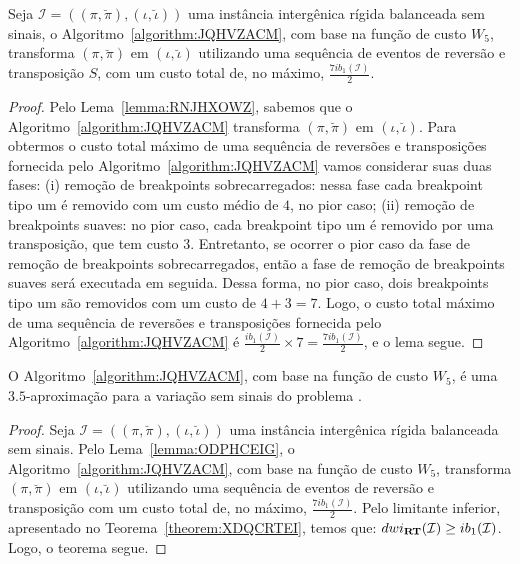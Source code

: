 \begin{lemma}\label{lemma:ODPHCEIG}
Seja $\mathcal{I} = ((\pi,\breve\pi),(\iota,\breve\iota))$ uma instância intergênica rígida balanceada sem sinais, o Algoritmo~\ref{algorithm:JQHVZACM}, com base na função de custo $W_5$, transforma $(\pi,\breve\pi)$ em $(\iota,\breve\iota)$ utilizando uma sequência de eventos de reversão e transposição $S$, com um custo total de, no máximo, $\frac{7ib_1(\mathcal{I})}{2}$.
\end{lemma}
\begin{proof}
Pelo Lema~\ref{lemma:RNJHXOWZ}, sabemos que o Algoritmo~\ref{algorithm:JQHVZACM} transforma $(\pi,\breve\pi)$ em $(\iota,\breve\iota)$. Para obtermos o custo total máximo de uma sequência de reversões e transposições fornecida pelo Algoritmo~\ref{algorithm:JQHVZACM} vamos considerar suas duas fases: (i) remoção de breakpoints sobrecarregados: nessa fase cada breakpoint tipo um é removido com um custo médio de $4$, no pior caso; (ii) remoção de breakpoints suaves: no pior caso, cada breakpoint tipo um é removido por uma transposição, que tem custo $3$. Entretanto, se ocorrer o pior caso da fase de remoção de breakpoints sobrecarregados, então a fase de remoção de breakpoints suaves será executada em seguida. Dessa forma, no pior caso, dois breakpoints tipo um são removidos com um custo de $4 + 3 = 7$. Logo, o custo total máximo de uma sequência de reversões e transposições fornecida pelo Algoritmo~\ref{algorithm:JQHVZACM} é $\frac{ib_1(\mathcal{I})}{2} \times 7 = \frac{7ib_1(\mathcal{I})}{2}$, e o lema segue. 
\end{proof}

\begin{theorem}\label{theorem:SEJEYSUH}
O Algoritmo~\ref{algorithm:JQHVZACM}, com base na função de custo $W_5$, é uma $3.5$-aproxima\-ção para a variação sem sinais do problema \SbWIRT{}.
\end{theorem}
\begin{proof}
Seja $\mathcal{I} = ((\pi,\breve\pi),(\iota,\breve\iota))$ uma instância intergênica rígida balanceada sem sinais. Pelo Lema~\ref{lemma:ODPHCEIG}, o Algoritmo~\ref{algorithm:JQHVZACM}, com base na função de custo $W_5$, transforma $(\pi,\breve\pi)$ em $(\iota,\breve\iota)$ utilizando uma sequência de eventos de reversão e transposição com um custo total de, no máximo, $\frac{7ib_1(\mathcal{I})}{2}$. Pelo limitante inferior, apresentado no Teorema~\ref{theorem:XDQCRTEI}, temos que: $dwi_{\textbf{RT}}(\mathcal{I}) \ge ib_1(\mathcal{I})$. Logo, o teorema segue.
\end{proof}

